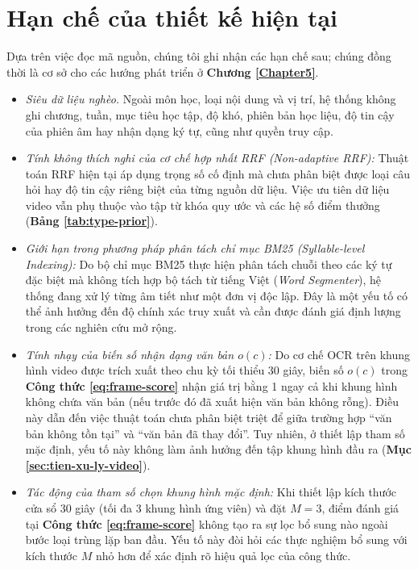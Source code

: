 \section{Hạn chế của thiết kế hiện tại}\label{sec:han-che}

Dựa trên việc đọc mã nguồn, chúng tôi ghi nhận các hạn chế sau; chúng đồng thời là cơ sở cho các hướng phát triển ở \textbf{Chương \ref{Chapter5}}.

\begin{itemize}
    \item \emph{Siêu dữ liệu nghèo.} Ngoài môn học, loại nội dung và vị trí, hệ thống không ghi chương, tuần, mục tiêu học tập, độ khó, phiên bản học liệu, độ tin cậy của phiên âm hay nhận dạng ký tự, cũng như quyền truy cập.
    \item \emph{Tính không thích nghi của cơ chế hợp nhất RRF (Non-adaptive RRF):} Thuật toán RRF hiện tại áp dụng trọng số cố định mà chưa phân biệt được loại câu hỏi hay độ tin cậy riêng biệt của từng nguồn dữ liệu. Việc ưu tiên dữ liệu video vẫn phụ thuộc vào tập từ khóa quy ước và các hệ số điểm thưởng (\textbf{Bảng \ref{tab:type-prior}}).
    \item \emph{Giới hạn trong phương pháp phân tách chỉ mục BM25 (Syllable-level Indexing):} Do bộ chỉ mục BM25 thực hiện phân tách chuỗi theo các ký tự đặc biệt mà không tích hợp bộ tách từ tiếng Việt (\textit{Word Segmenter}), hệ thống đang xử lý từng âm tiết như một đơn vị độc lập. Đây là một yếu tố có thể ảnh hưởng đến độ chính xác truy xuất và cần được đánh giá định lượng trong các nghiên cứu mở rộng.
    \item \emph{Tính nhạy của biến số nhận dạng văn bản $o(c)$:} Do cơ chế OCR trên khung hình video được trích xuất theo chu kỳ tối thiểu 30 giây, biến số $o(c)$ trong \textbf{Công thức \ref{eq:frame-score}} nhận giá trị bằng 1 ngay cả khi khung hình không chứa văn bản (nếu trước đó đã xuất hiện văn bản không rỗng). Điều này dẫn đến việc thuật toán chưa phân biệt triệt để giữa trường hợp ``văn bản không tồn tại'' và ``văn bản đã thay đổi''. Tuy nhiên, ở thiết lập tham số mặc định, yếu tố này không làm ảnh hưởng đến tập khung hình đầu ra (\textbf{Mục \ref{sec:tien-xu-ly-video}}).
    \item \emph{Tác động của tham số chọn khung hình mặc định:} Khi thiết lập kích thước cửa sổ 30 giây (tối đa 3 khung hình ứng viên) và đặt $M = 3$, điểm đánh giá tại \textbf{Công thức \ref{eq:frame-score}} không tạo ra sự lọc bổ sung nào ngoài bước loại trùng lặp ban đầu. Yếu tố này đòi hỏi các thực nghiệm bổ sung với kích thước $M$ nhỏ hơn để xác định rõ hiệu quả lọc của công thức.

\end{itemize}
